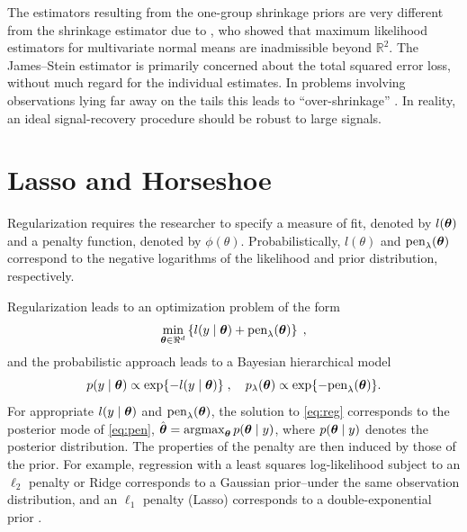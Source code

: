 \documentclass[sts,preprint]{imsart}
\begin{document}
The estimators resulting from the one-group shrinkage priors are very different from the shrinkage estimator due to \citet{james_estimation_1961}, who showed that maximum likelihood estimators for multivariate normal means are inadmissible beyond $\mathbb{R}^2$. The James--Stein estimator is primarily concerned about the total squared error loss, without much regard for the individual estimates. In problems involving observations lying far away on the tails this leads to ``over-shrinkage'' \citep{carvalho2010horseshoe}. In reality, an ideal signal-recovery procedure should be robust to large signals. 


\section{Lasso and Horseshoe}\label{sec:4}


Regularization requires the researcher to specify a measure of fit, denoted by $l(\boldsymbol{\theta})$ and a penalty function, denoted by $\phi(\theta)$. Probabilistically,  $l(\theta)$ and $\text{pen}_{\lambda}(\boldsymbol{\theta})$ correspond to the negative logarithms of the likelihood and prior distribution, respectively.  

Regularization leads to an optimization problem of the form 
\begin{equation}
  \min_{\boldsymbol{\theta} \in \Re^d}
  \left\{ l(y \mid \boldsymbol{\theta}) + \text{pen}_{\lambda}(\boldsymbol{\theta}) \right\}
  \;, 
  \label{eq:reg}
\end{equation}
and the probabilistic approach leads to a Bayesian hierarchical model
\begin{equation}
  p(y \mid \boldsymbol{\theta}) \propto \exp\{-l(y \mid \boldsymbol{\theta})\} \; , \quad p_{\lambda}(\boldsymbol{\theta})
  \propto \exp\{ -\text{pen}_{\lambda}(\boldsymbol{\theta}) \}. 
  \label{eq:pen}
\end{equation}
For appropriate $l(y \mid \boldsymbol{\theta})$ and $\text{pen}_{\lambda}(\boldsymbol{\theta})$, the solution to \eqref{eq:reg} corresponds to the posterior mode of \eqref{eq:pen}, $\hat{\btheta} = \argmax_{\btheta} p(\btheta \mid y)$, where $p(\boldsymbol{\theta} \mid y)$ denotes the posterior distribution. The properties of the penalty are then induced by those of the prior.  For example, regression with a least squares log-likelihood subject to an $\ell_2$ penalty or Ridge \citep{tikhonov1963solution, hoerl70} corresponds to a Gaussian prior--under the same observation distribution, and an $\ell_1$ penalty (Lasso) \citep{tibshirani96} corresponds to a double-exponential prior \citep{park_bayesian_2008}.
\end{document}
